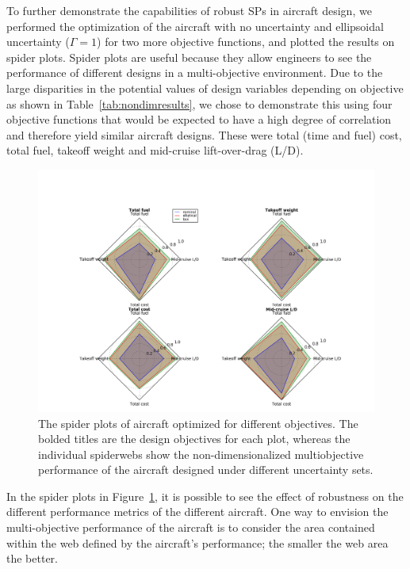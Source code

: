 To further demonstrate the capabilities of robust SPs in aircraft design,
we performed the optimization of the aircraft with no uncertainty and ellipsoidal uncertainty ($\Gamma = 1$)
for two more objective functions, and plotted the results on spider plots.
Spider plots are useful because they allow engineers to see the performance of different designs in a multi-objective
environment. Due to the large disparities in the potential values of design variables depending
on objective as shown in Table~\ref{tab:nondimresults}, we chose to demonstrate this using four objective functions
that would be expected to have a high degree of correlation and therefore yield similar aircraft designs. These were
 total (time and fuel) cost, total fuel, takeoff weight and mid-cruise lift-over-drag (L/D).

\begin{figure}
    \includegraphics[width = 0.95\linewidth]{figures/4objradar.png}
    \caption{The spider plots of aircraft optimized for different objectives.
    The bolded titles are the design objectives for each plot, whereas the individual spiderwebs
    show the non-dimensionalized multiobjective performance of the aircraft designed under different
    uncertainty sets.}
    \label{fig:spider}
\end{figure}

In the spider plots in Figure~\ref{fig:spider}, it is possible to see the effect of robustness on
the different performance metrics of the different aircraft. One way to envision the multi-objective
performance of the aircraft is to consider the area contained within the web defined by the aircraft's
performance; the smaller the web area the better.

